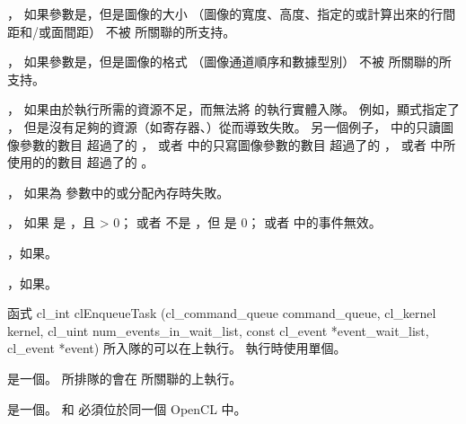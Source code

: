 \item {}，
如果參數是，但是圖像的大小
（圖像的寬度、高度、指定的或計算出來的行間距和/或面間距）
不被  所關聯的所支持。

\item {}，
如果參數是，但是圖像的格式
（圖像通道順序和數據型別）
不被  所關聯的所支持。

\item {}，
如果由於執行所需的資源不足，而無法將  的執行實體入隊。
例如，顯式指定了 ，
但是沒有足夠的資源（如寄存器、）從而導致失敗。
另一個例子， 中的只讀圖像參數的數目
超過了的 ，
或者 中的只寫圖像參數的數目
超過了的 ，
或者 中所使用的的數目
超過了的 。

\item {}，
如果為  參數中的或分配內存時失敗。

\item {}，
  如果  是 ，且  > 0；
  或者  不是 ，但  是 0；
  或者  中的事件無效。

\item {}，如果\scdevfailres。

\item {}，如果\schostfailres。
\stopigBase

函式
\startCLFUNC
cl_int
clEnqueueTask (cl_command_queue command_queue,
		cl_kernel kernel,
		cl_uint num_events_in_wait_list,
		const cl_event *event_wait_list,
		cl_event *event)
\stopCLFUNC
所入隊的可以在上執行。
執行時使用單個。

 是一個。
所排隊的會在  所關聯的上執行。

 是一個。
  和  必須位於同一個 OpenCL 中。

